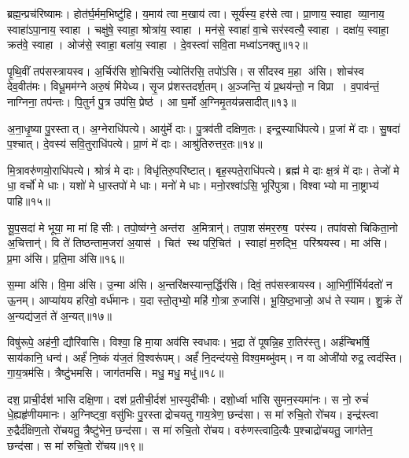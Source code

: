 ब्रह्म॒न्प्रच॑रिष्यामः। 
होत॑र्घ॒र्मम॒भिष्टु॑हि। 
य॒माय॑ त्वा म॒खाय॑ त्वा। 
सूर्य॑स्य॒ हर॑से त्वा। 
प्रा॒णाय॒ स्वाहा व्या॒नाय॒ स्वाहा॑ऽपा॒नाय॒ स्वाहा। 
चक्षु॑षे॒ स्वाहा॒ श्रोत्रा॑य॒ स्वाहा। 
मन॑से॒ स्वाहा॑ वा॒चे सर॑स्वत्यै॒ स्वाहा। 
दक्षा॑य॒ स्वाहा॒ क्रत॑वे॒ स्वाहा। 
ओज॑से॒ स्वाहा॒ बला॑य॒ स्वाहा। 
दे॒वस्त्वा॑ सवि॒ता मध्वा॑ऽनक्तु॥१२॥

पृ॒थि॒वीं तप॑सस्त्रायस्व। 
अ॒र्चिर॑सि शो॒चिर॑सि॒ ज्योति॑रसि॒ तपो॑ऽसि। 
ससी॑दस्व म॒हा अ॑सि। 
शोच॑स्व देव॒वीत॑मः। 
विधू॒मम॑ग्ने अरु॒षं मि॑येध्य। 
सृ॒ज प्र॑शस्तदर्\mbox{}श॒तम्। 
अ॒ञ्जन्ति॒ यं प्र॒थय॑न्तो॒ न विप्रा। 
व॒पाव॑न्तं॒ नाग्निना॒ तप॑न्तः। 
पि॒तुर्न पु॒त्र उप॑सि॒ प्रेष्ठ॑। 
आ घ॒र्मो अ॒ग्निमृ॒तय॑न्नसादीत्॥१३॥

अ॒ना॒धृ॒ष्या पु॒रस्तात्। 
अ॒ग्नेराधि॑पत्ये। 
आयु॑र्मे दाः। 
पु॒त्रव॑ती दक्षिण॒तः। 
इन्द्र॒स्याधि॑पत्ये। 
प्र॒जां मे॑ दाः। 
सु॒षदा॑ प॒श्चात्। 
दे॒वस्य॑ सवि॒तुराधि॑पत्ये। 
प्रा॒णं मे॑ दाः। 
आश्रु॑तिरुत्तर॒तः॥१४॥

मि॒त्रावरु॑णयो॒राधि॑पत्ये। 
श्रोत्रं॑ मे दाः। 
विधृ॑तिरु॒परि॑ष्टात्। 
बृह॒स्पते॒राधि॑पत्ये। 
ब्रह्म॑ मे दाः क्ष॒त्रं मे॑ दाः। 
तेजो॑ मे धा॒ वर्चो॑ मे धाः। 
यशो॑ मे धा॒स्तपो॑ मे धाः। 
मनो॑ मे धाः। 
मनो॒रश्वा॑ऽसि॒ भूरि॑पुत्रा। 
विश्वाभ्यो मा ना॒ष्ट्राभ्य॑ पाहि॥१५॥

सू॒प॒सदा॑ मे भूया॒ मा मा॑ हिसीः। 
तपो॒ष्व॑ग्ने॒ अन्त॑रा अ॒मित्रान्॑। 
तपा॒शस॑मर॒रुष॒ पर॑स्य। 
तपा॑वसो चिकिता॒नो अ॒चित्तान्॑। 
वि ते॑ तिष्ठन्ताम॒जरा॑ अ॒यास॑। 
चित॑ स्थ परि॒चित॑। 
स्वाहा॑ म॒रुद्भि॒ परि॑श्रयस्व। 
मा अ॑सि। 
प्र॒मा अ॑सि। 
प्र॒ति॒मा अ॑सि॥१६॥

स॒म्मा अ॑सि। 
वि॒मा अ॑सि। 
उ॒न्मा अ॑सि। 
अ॒न्तरि॑क्षस्यान्त॒र्द्धि\-र॑सि। 
दिवं॒ तप॑सस्त्रायस्व। 
आ॒भिर्गी॒र्भिर्यदतो॑ न ऊ॒नम्। 
आप्या॑यय हरिवो॒ वर्ध॑मानः। 
य॒दा स्तो॒तृभ्यो॒ महि॑ गो॒त्रा रु॒जासि॑। 
भू॒यि॒ष्ठ॒भाजो॒ अध॑ ते स्याम। 
शु॒क्रं ते॑ अ॒न्यद्य॑ज॒तं ते॑ अ॒न्यत्॥१७॥

विषु॑रूपे॒ अह॑नी॒ द्यौरि॑वासि। 
विश्वा॒ हि मा॒या अव॑सि स्वधावः। 
भ॒द्रा ते॑ पूषन्नि॒ह रा॒तिर॑स्तु। 
अर्\mbox{}ह॑न्बिभर्\mbox{}षि॒ साय॑कानि॒ धन्व॑। 
अर्\mbox{}हं॑ नि॒ष्कं य॑ज॒तं  वि॒श्वरू॑पम्। 
अर्\mbox{}हं॑ नि॒दन्द॑यसे॒ विश्व॒मब्भु॑वम्। 
न वा ओजी॑यो रुद्र॒ त्वद॑स्ति। 
गा॒य॒त्रम॑सि। 
त्रैष्टु॑भमसि। 
जाग॑तमसि। 
मधु॒ मधु॒ मधु॑॥१८॥
\anuvakamend[अ॒न॒क्त्व॒सा॒दी॒दु॒त्त॒र॒तः पा॑हि प्रति॒मा अ॑सि यज॒तन्ते॑ अ॒न्यज्जाग॑तम॒स्येकं॑ च]

दश॒ प्राची॒र्दश॑ भासि दक्षि॒णा। 
दश॑ प्र॒तीची॒र्दश॑ भा॒स्युदी॑चीः। 
दशो॒र्ध्वा भा॑सि सुमन॒स्यमा॑नः। 
स नो॒ रुचं॑ धे॒ह्यहृ॑णीयमानः। 
अ॒ग्निष्ट्वा॒ वसु॑भिः पु॒रस्ताद्रोचयतु गाय॒त्रेण॒ छन्द॑सा। 
स मा॑ रुचि॒तो रो॑चय। 
इन्द्र॑स्त्वा रु॒द्रैर्द॑क्षिण॒तो रो॑चयतु॒ त्रैष्टु॑भेन॒ छन्द॑सा। 
स मा॑ रुचि॒तो रो॑चय। 
वरु॑णस्त्वादि॒त्यैः प॒श्चाद्रो॑चयतु॒ जाग॑तेन॒ छन्द॑सा। 
स मा॑ रुचि॒तो रो॑चय॥१९॥

